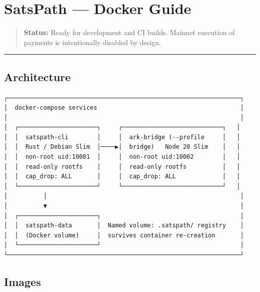 \documentclass[
]{article}
\author{}
\date{}
\begin{document}
\hypertarget{satspath-docker-guide}{%
\section{SatsPath --- Docker Guide}\label{satspath-docker-guide}}

\begin{quote}
\textbf{Status:} Ready for development and CI builds. Mainnet execution
of payments is intentionally disabled by design.
\end{quote}

\begin{center}\rule{0.5\linewidth}{0.5pt}\end{center}

\hypertarget{architecture}{%
\subsection{Architecture}\label{architecture}}

\begin{verbatim}
┌─────────────────────────────────────────────────────────────────┐
│  docker-compose services                                        │
│                                                                 │
│  ┌──────────────────────┐     ┌────────────────────────────┐   │
│  │  satspath-cli        │     │  ark-bridge (--profile     │   │
│  │  Rust / Debian Slim  │────▶│  bridge)   Node 20 Slim    │   │
│  │  non-root uid:10001  │     │  non-root uid:10002        │   │
│  │  read-only rootfs    │     │  read-only rootfs          │   │
│  │  cap_drop: ALL       │     │  cap_drop: ALL             │   │
│  └──────────────────────┘     └────────────────────────────┘   │
│          │                                                      │
│          ▼                                                      │
│  ┌──────────────────────┐                                       │
│  │  satspath-data       │  Named volume: .satspath/ registry    │
│  │  (Docker volume)     │  survives container re-creation       │
│  └──────────────────────┘                                       │
└─────────────────────────────────────────────────────────────────┘
\end{verbatim}

\hypertarget{images}{%
\subsection{Images}\label{images}}
\end{document}
